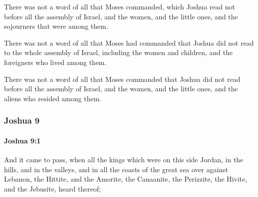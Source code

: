 			\begin{versebox}
					\item[BHS] 
					\item[ASV] There was not a word of all that Moses commanded, which Joshua read not before all the assembly of Israel, and the women, and the little ones, and the sojourners that were among them.
					\item[NIV] There was not a word of all that Moses had commanded that Joshua did not read to the whole assembly of Israel, including the women and children, and the foreigners who lived among them.
					\item[NRSV] There was not a word of all that Moses commanded that Joshua did not read before all the assembly of Israel, and the women, and the little ones, and the aliens who resided among them.
			\end{versebox}
	\subsubsection{Joshua 9} %
		\label{JOSHUA-9}

		\paragraph{Joshua 9:1} %
			\label{JOSHUA-9-1}

			And it came to pass, when all the kings which were on this side Jordan, in the hills, and in the valleys, and in all the coasts of the great sea over against Lebanon, the Hittite, and the Amorite, the Canaanite, the Perizzite, the Hivite, and the Jebusite, heard thereof;

